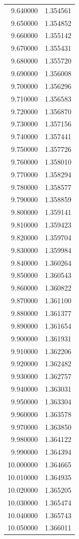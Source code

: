\begin{tabular}{rr}
9.640000 & 1.354561 \\
9.650000 & 1.354852 \\
9.660000 & 1.355142 \\
9.670000 & 1.355431 \\
9.680000 & 1.355720 \\
9.690000 & 1.356008 \\
9.700000 & 1.356296 \\
9.710000 & 1.356583 \\
9.720000 & 1.356870 \\
9.730000 & 1.357156 \\
9.740000 & 1.357441 \\
9.750000 & 1.357726 \\
9.760000 & 1.358010 \\
9.770000 & 1.358294 \\
9.780000 & 1.358577 \\
9.790000 & 1.358859 \\
9.800000 & 1.359141 \\
9.810000 & 1.359423 \\
9.820000 & 1.359704 \\
9.830000 & 1.359984 \\
9.840000 & 1.360264 \\
9.850000 & 1.360543 \\
9.860000 & 1.360822 \\
9.870000 & 1.361100 \\
9.880000 & 1.361377 \\
9.890000 & 1.361654 \\
9.900000 & 1.361931 \\
9.910000 & 1.362206 \\
9.920000 & 1.362482 \\
9.930000 & 1.362757 \\
9.940000 & 1.363031 \\
9.950000 & 1.363304 \\
9.960000 & 1.363578 \\
9.970000 & 1.363850 \\
9.980000 & 1.364122 \\
9.990000 & 1.364394 \\
10.000000 & 1.364665 \\
10.010000 & 1.364935 \\
10.020000 & 1.365205 \\
10.030000 & 1.365474 \\
10.040000 & 1.365743 \\
10.050000 & 1.366011 \\

\end{tabular}
